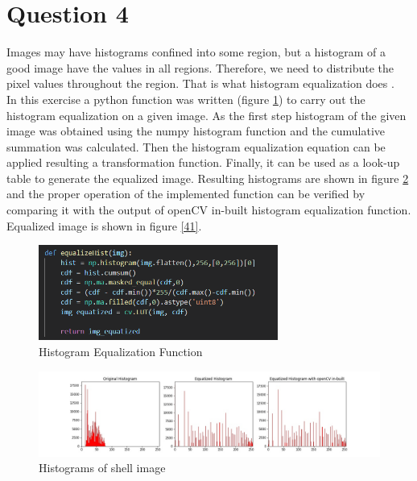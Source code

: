\documentclass[11pt]{article}
\begin{document}
\section*{Question 4}

Images may have histograms confined into some region, but a histogram of a good image have the values in all regions. Therefore, we need to 
distribute the pixel values throughout the region. That is what histogram equalization does  \cite{histo}. \\

\noindent In this exercise a python function was written (figure \ref{Histogram Equalization Function}) to carry out the histogram equalization on a given image. As the first step histogram of the given image was
obtained using the numpy histogram function and the cumulative summation was calculated. Then the histogram equalization equation can be 
applied resulting a transformation function. Finally, it can be used as a look-up table to generate the equalized image.
Resulting histograms are shown in figure \ref{Histograms} and the proper operation of the implemented function can be verified by comparing it 
with the output of openCV in-built histogram equalization function. Equalized image is shown in figure \ref{41}.

\begin{figure}[!h]
    \centering
    \includegraphics[width=0.7\textwidth]{Images/40.PNG}
    \caption{Histogram Equalization Function}
    \label{Histogram Equalization Function}
\end{figure}

\begin{figure}[!h]
    \centering
    \includegraphics[width=\textwidth]{Images/42.jpg}
    \caption{Histograms of shell image}
    \label{Histograms}
\end{figure}
\end{document}
